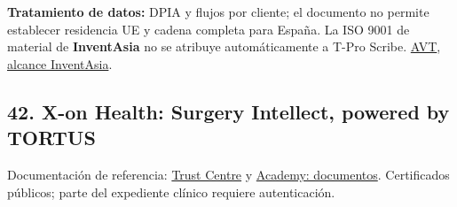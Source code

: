 \textbf{Tratamiento de datos:} DPIA y flujos por cliente; el documento no permite establecer residencia UE y cadena completa para España. La ISO 9001 de material de \textbf{InventAsia} no se atribuye automáticamente a T-Pro Scribe. \href{https://info.tpro.io/hubfs/T-Pro\%20Scribe\%20with\%20Compliance\%20with\%20NHS\%20England\%20AVT\%20Requirements.pdf?hsLang=en}{AVT}, \href{https://info.tpro.io/hubfs/PDFs/T-Pro\%20Compliance\%20-\%20Invent\%20Asia.pdf?hsLang=en}{alcance InventAsia}.

\subsection*{42. X-on Health: Surgery Intellect, powered by TORTUS}
\label{provider:42}

Documentación de referencia: \href{https://www.x-on.co.uk/trust-centre/}{Trust Centre} y \href{https://surgeryconnect.academy/trust-centre/}{Academy: documentos}. Certificados públicos; parte del expediente clínico requiere autenticación.

